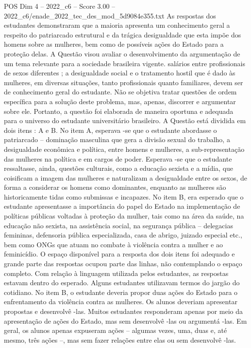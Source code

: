 \begin{textsample}{POS Dim 4 – 2022\_c6 – Score 3.00 – 2022\_c6/enade\_2022\_tec\_des\_mod\_5d9084e355.txt}
As respostas dos estudantes demonstraram que a maioria apresenta um conhecimento geral a respeito do patriarcado estrutural e da trágica desigualdade que esta impõe dos homens sobre as mulheres, bem como de possíveis ações do Estado para a proteção delas.
A Questão visou avaliar o desenvolvimento da argumentação de um tema relevante para a sociedade brasileira vigente. salários entre profissionais de sexos diferentes ; a desigualdade social e o tratamento hostil que é dado às mulheres, em diversas situações, tanto profissionais quanto familiares, devem ser de conhecimento geral do estudante.
Não se objetiva tratar questões de ordem específica para a solução deste problema, mas, apenas, discorrer e argumentar sobre ele.
Portanto, a questão foi elaborada de maneira oportuna e adequada para o universo do estudante universitário brasileiro.
A Questão está dividida em dois itens : A e B.
No item A, esperava -se que o estudante abordasse o patriarcado – dominação masculina que gera a divisão sexual do trabalho, a desigualdade econômica e política, entre homens e mulheres, a sub-representação das mulheres na política e em cargos de poder.
Esperava -se que o estudante ressaltasse, ainda, questões culturais, como a educação sexista e a mídia, que coisificam a imagem das mulheres e naturalizam a desigualdade entre os sexos, de forma a considerar os homens como dominantes, enquanto as mulheres são historicamente tidas como submissas e incapazes.
No item B, era esperado que o estudante apresentasse a importância do papel do Estado na implementação de políticas públicas voltadas à proteção da mulher, tais como na área da saúde, na educação não sexista, na assistência social, na segurança pública – delegacias femininas, defensoria pública especializada, casa de abrigo, juizado especial etc., bem como ONGs que atuam no combate à violência contra a mulher e ao feminicídio.
O espaço disponível para a resposta dos dois itens foi adequado e grande parte das respostas ocupou parte das linhas, não contemplando o espaço completo.
Com relação à linguagem utilizada pelos estudantes, as respostas estavam dentro do esperado.
Alguns estudantes utilizavam termos do jargão do cotidiano.
No item B, o estudante deveria propor duas ações do Estado para o enfrentamento da violência contra as mulheres.
Os alunos deveriam apresentar propostas e desenvolvê -las.
Muitos estudantes responderam apenas por meio da apresentação de ações do Estado, mas sem desenvolvê -las ou argumentá -las.
Em geral, os alunos apenas expuseram ações – algumas vezes, uma, duas e, até mesmo, três ações –, mas sem fazer relações entre elas ou sem desenvolvê -las.

\end{textsample}
